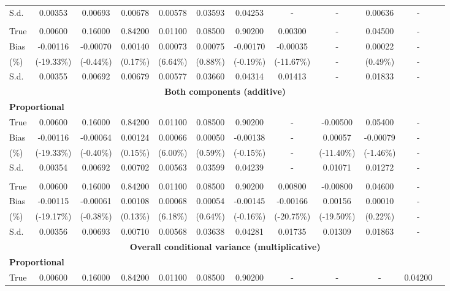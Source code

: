 \documentclass[12pt]{article}
\begin{document}
\begin{table}[!ht]
{\begin{tabular}{lccccccccccc}
      S.d.  & 0.00353 & 0.00693 & 0.00678 & 0.00578 & 0.03593 & 0.04253 & - & - & 0.00636 & -\\
      \addlinespace
      \multicolumn{12}{l}{\textbf{Non-Proportional}}\\
      True & 0.00600 & 0.16000 & 0.84200 & 0.01100 & 0.08500 & 0.90200 & 0.00300 & - & 0.04500 & -\\
      Bias & -0.00116 & -0.00070 & 0.00140 & 0.00073 & 0.00075 & -0.00170 & -0.00035 & - & 0.00022 & -\\
      (\%)  & (-19.33\%) & (-0.44\%) & (0.17\%) & (6.64\%) & (0.88\%) & (-0.19\%) & (-11.67\%) & - & (0.49\%) & -\\
      S.d.  & 0.00355 & 0.00692 & 0.00679 & 0.00577 & 0.03660 & 0.04314 & 0.01413 & - & 0.01833 & -\\
      \midrule
      \multicolumn{12}{c}{\textbf{Both components (additive)}}\\
      \multicolumn{12}{l}{\textbf{Proportional}}\\
      True & 0.00600 & 0.16000 & 0.84200 & 0.01100 & 0.08500 & 0.90200 & - & -0.00500 & 0.05400 & -\\
      Bias & -0.00116 & -0.00064 & 0.00124 & 0.00066 & 0.00050 & -0.00138 & - & 0.00057 & -0.00079 & -\\
      (\%)  & (-19.33\%) & (-0.40\%) & (0.15\%) & (6.00\%) & (0.59\%) & (-0.15\%) & - & (-11.40\%) & (-1.46\%) & -\\
      S.d.  & 0.00354 & 0.00692 & 0.00702 & 0.00563 & 0.03599 & 0.04239 & - & 0.01071 & 0.01272 & -\\
      \addlinespace
      \multicolumn{12}{l}{\textbf{Non-Proportional}}\\
      True & 0.00600 & 0.16000 & 0.84200 & 0.01100 & 0.08500 & 0.90200 & 0.00800 & -0.00800 & 0.04600 & -\\
      Bias & -0.00115 & -0.00061 & 0.00108 & 0.00068 & 0.00054 & -0.00145 & -0.00166 & 0.00156 & 0.00010 & -\\
      (\%)  & (-19.17\%) & (-0.38\%) & (0.13\%) & (6.18\%) & (0.64\%) & (-0.16\%) & (-20.75\%) & (-19.50\%) & (0.22\%) & -\\
      S.d.  & 0.00356 & 0.00693 & 0.00710 & 0.00568 & 0.03638 & 0.04281 & 0.01735 & 0.01309 & 0.01863 & -\\
      \midrule
      \multicolumn{12}{c}{\textbf{Overall conditional variance (multiplicative)}}\\
      \multicolumn{12}{l}{\textbf{Proportional}}\\
      True & 0.00600 & 0.16000 & 0.84200 & 0.01100 & 0.08500 & 0.90200 & - & - & - & 0.04200\\

\end{tabular}}
\end{table}
\end{document}
